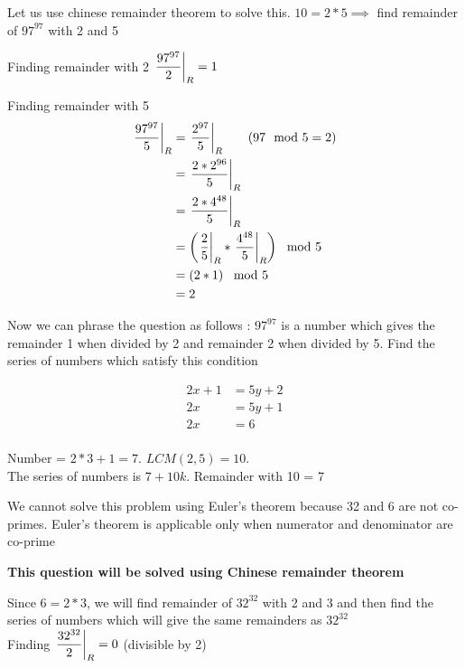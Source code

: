 
Let us use chinese remainder theorem to solve this. $10 = 2 * 5 \implies$ find remainder of $97^{97}$ with 2 and 5

Finding remainder with 2
$\displaystyle{ \left. \frac{ 97^{97} }{2} \right |_{R} } = 1$

Finding remainder with 5
\begin{align*}
    \displaystyle{ \left. \frac{ 97^{97} }{5} \right |_{R} } &= \displaystyle{ \left. \frac{ 2^{97} }{5} \right |_{R} } \tag{$97 \mod 5 = 2$} \\
    &= \displaystyle{ \left. \frac{ 2 * 2^{96} }{5} \right |_{R} } \\
    &= \displaystyle{ \left. \frac{ 2 * 4^{48} }{5} \right |_{R} } \\
    &= \left (  \displaystyle{ \left. \frac{2}{5} \right |_{R} } * \displaystyle{ \left. \frac{4^{48}}{5} \right |_{R} }  \right ) \mod 5 \\
    &= \left ( 2 * 1 \right ) \mod 5 \\
    &= 2 
\end{align*}

Now we can phrase the question as follows : $97^{97}$ is a number which gives the remainder 1 when divided by 2 and remainder 2 when divided by 5. Find the series of numbers which satisfy this condition

\begin{align*}
    2x + 1 &= 5y + 2 \\
    2x &= 5y + 1 \\
    2x &= 6 \tag{$y=1 \implies x=3$} \\
\end{align*}

Number = $2*3 + 1 = 7$. $LCM(2,5) = 10$. \\

The series of numbers is $7 + 10k$. Remainder with 10 = 7


\begin{WARNING}
    We cannot solve this problem using Euler's theorem because 32 and 6 are not co-primes. Euler's theorem is applicable only when numerator and denominator are co-prime
\end{WARNING}

\textbf{This question will be solved using Chinese remainder theorem}

Since $6 = 2 * 3$, we will find remainder of $32^{32}$ with 2 and 3 and then find the series of numbers which will give the same remainders as $32^{32}$ \\

Finding $\displaystyle{ \left. \frac{32^{32}}{2} \right |_{R} } = 0$ (divisible by 2)

